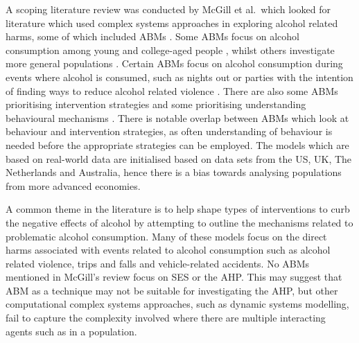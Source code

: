 A scoping literature review was conducted by McGill et al.~which looked for literature which used complex systems approaches in exploring alcohol related harms, some of which included \ac{ABM}s \cite{scopingReview}. Some \ac{ABM}s focus on alcohol consumption among young and college-aged people \cite{collegeABMCLD, abmCollegeConsumption, abmCollegePolicyandMechanisms, abmYoungAus, abmNetLogo}, whilst others investigate more general populations \cite{abmBinge, abmAlcoholTaxation, abmDutchAdults, abmDrinkingBehaviour, abmEcologicalNiche, abmTradingHours, abmPublicTransport}. 
Certain \ac{ABM}s focus on alcohol consumption during events where alcohol is consumed, such as nights out or parties with the intention of finding ways to reduce alcohol related violence \cite{abmVenueLock, abmPublicTransport, abmAlcoholCrime, abmSimARC, abmDrinkingBehaviour, abmEcologicalNiche, abmTradingHours, abmRiskBehaviourDev}. There are also some \ac{ABM}s prioritising intervention strategies \cite{collegeABMCLD, abmVenueLock, abmPublicTransport, abmNetLogo, abmPolicyInterventions, abmCollegePolicyandMechanisms, abmAlcoholTaxation, abmDrinkingBehaviour} and some prioritising understanding behavioural mechanisms \cite{collegeABMCLD, abmRiskBehaviourDev, abmYoungAus, abmCollegeConsumption, abmCollegePolicyandMechanisms, abmAlcoholCrime, abmBinge, abmSimARC, abmDutchAdults, abmDrinkingBehaviour, abmEcologicalNiche}. There is notable overlap between \ac{ABM}s which look at behaviour and intervention strategies, as often understanding of behaviour is needed before the appropriate strategies can be employed. The models which are based on real-world data are initialised based on data sets from the US, UK, The Netherlands and Australia, hence there is a bias towards analysing populations from more advanced economies.

A common theme in the literature  is to help shape types of interventions to curb the negative effects of alcohol by attempting to outline the mechanisms related to problematic alcohol consumption. Many of these models focus on the direct harms associated with events related to alcohol consumption such as alcohol related violence, trips and falls and vehicle-related accidents. No \ac{ABM}s mentioned in McGill's review focus on \ac{SES} or the \ac{AHP}. This may suggest that \ac{ABM} as a technique may not be suitable for investigating the \ac{AHP}, but other computational complex systems approaches, such as dynamic systems modelling, fail to capture the complexity involved where there are multiple interacting agents such as in a population. 

